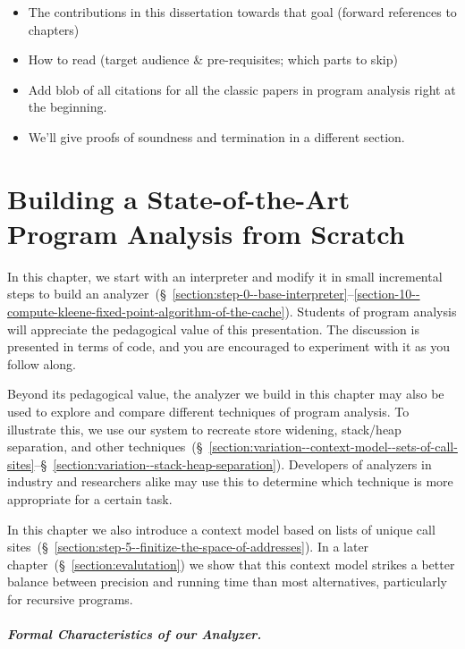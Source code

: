 \documentclass[12pt, oneside]{book}
\begin{document}
\begin{itemize}
  \item The contributions in this dissertation towards that goal (forward references to chapters)
  \item How to read (target audience \& pre-requisites; which parts to skip)
  \item Add blob of all citations for all the classic papers in program analysis right at the beginning.
  \item We’ll give proofs of soundness and termination in a different section.
\end{itemize}

\chapter{Building a State-of-the-Art Program Analysis from Scratch}
\label{section:building-a-state-of-the-art-program-analysis-from-scratch}

In this chapter, we start with an interpreter and modify it in small incremental steps to build an analyzer~(§~\ref{section:step-0--base-interpreter}–\ref{section-10--compute-kleene-fixed-point-algorithm-of-the-cache}). Students of program analysis will appreciate the pedagogical value of this presentation. The discussion is presented in terms of code, and you are encouraged to experiment with it as you follow along.

Beyond its pedagogical value, the analyzer we build in this chapter may also be used to explore and compare different techniques of program analysis. To illustrate this, we use our system to recreate store widening, stack/heap separation, and other techniques~(§~\ref{section:variation--context-model--sets-of-call-sites}–§~\ref{section:variation--stack-heap-separation}). Developers of analyzers in industry and researchers alike may use this to determine which technique is more appropriate for a certain task.

In this chapter we also introduce a context model based on lists of unique call sites~(§~\ref{section:step-5--finitize-the-space-of-addresses}). In a later chapter~(§~\ref{section:evalutation}) we show that this context model strikes a better balance between precision and running time than most alternatives, particularly for recursive programs.

\paragraph{Formal Characteristics of our Analyzer.}
\end{document}
